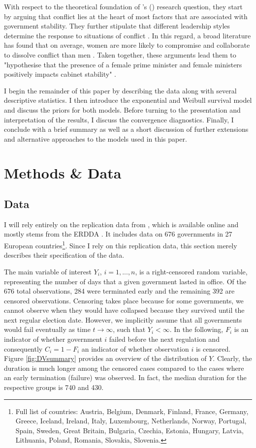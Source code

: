 \documentclass[11pt]{article}
\newcommand\possecite[1]{\citeauthor{#1}'s (\citeyear{#1})}
\begin{document}
With respect to the theoretical foundation of \possecite{KK20} research question, they start by arguing that conflict lies at the heart of most factors that are associated with government stability. They further stipulate that different leadership styles determine the response to situations of conflict \parencite{KK20}. In this regard, a broad literature has found that on average, women are more likely to compromise and collaborate to dissolve conflict than men \parencite[e.g.][]{KellermanRhode2017women}. Taken together, these arguments lead them to "hypothesise that the presence of a female prime minister and female ministers positively impacts cabinet stability" \parencite[4]{KK20}.

I begin the remainder of this paper by describing the data along with several descriptive statistics. I then introduce the exponential and Weibull survival model and discuss the priors for both models. Before turning to the presentation and interpretation of the results, I discuss the convergence diagnostics. Finally, I conclude with a brief summary as well as a short discussion of further extensions and alternative approaches to the models used in this paper.

\section{Methods \& Data}
\subsection{Data}
I will rely entirely on the replication data from \textcite{KK20}, which is available online and mostly stems from the ERDDA \parencite{ERD2014}. It includes data on 676 governments in 27 European countries\footnote{Full list of countries: Austria, Belgium, Denmark, Finland, France, Germany, Greece, Iceland, Ireland, Italy, Luxembourg, Netherlands, Norway, Portugal, Spain, Sweden, Great Britain, Bulgaria, Czechia, Estonia, Hungary, Latvia, Lithuania, Poland, Romania, Slovakia, Slovenia.}. Since I rely on this replication data, this section merely describes their specification of the data. 

The main variable of interest $Y_i$, $i = 1, ..., n$, is a right-censored random variable, representing the number of days that a given government lasted in office. Of the 676 total observations, 284 were terminated early and the remaining 392 are censored observations. Censoring takes place because for some governments, we cannot observe when they would have collapsed because they survived until the next regular election date. However, we implicitly assume that all governments would fail eventually as time $t \to \infty$, such that $Y_i < \infty$. In the following, $F_i$ is an indicator of whether government $i$ failed before the next regulation and consequently $C_i = 1-F_i$ an indicator of whether observation $i$ is censored. Figure \ref{fig:DVsummary} provides an overview of the distribution of $Y$. Clearly, the duration is much longer among the censored cases compared to the cases where an early termination (failure) was observed. In fact, the median duration for the respective groups is 740 and 430.
\end{document}
